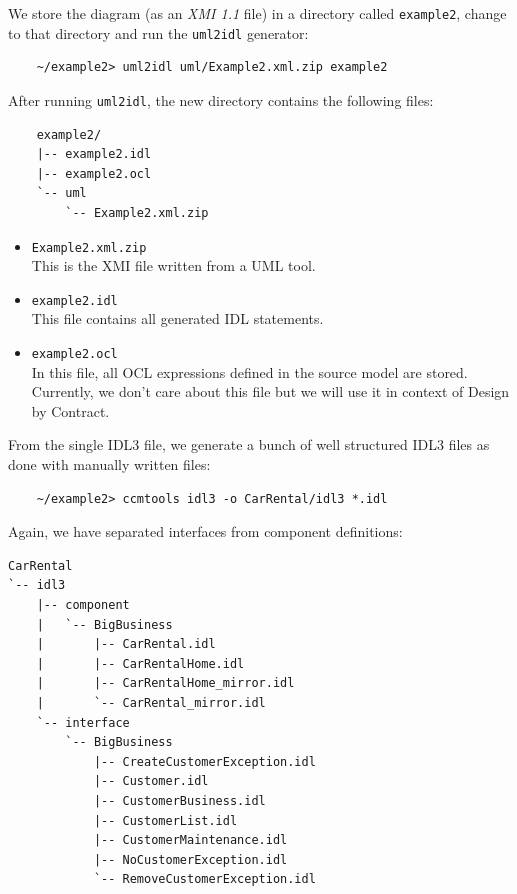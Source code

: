 We store the diagram (as an {\it XMI 1.1} file) in a directory called 
{\tt example2}, change to that directory and run the {\tt uml2idl} generator:
\begin{small}
\begin{verbatim}
    ~/example2> uml2idl uml/Example2.xml.zip example2
\end{verbatim}
\end{small}
After running {\tt uml2idl}, the new directory contains the following files:
\begin{small}
\begin{verbatim}
    example2/
    |-- example2.idl
    |-- example2.ocl
    `-- uml
        `-- Example2.xml.zip
\end{verbatim}
\end{small}

\newpage
\begin{itemize}
\item {\tt Example2.xml.zip}\\
This is the XMI file written from a UML tool.

\item {\tt example2.idl}\\ 
This file contains all generated IDL statements. 

\item {\tt example2.ocl} \\
In this file, all OCL expressions defined in the source model are stored.
Currently, we don't care about this file but we will use it in context of
Design by Contract. 
\end{itemize}

From the single IDL3 file, we generate a bunch of well structured 
IDL3 files as done with manually written files:
\begin{small}
\begin{verbatim}
    ~/example2> ccmtools idl3 -o CarRental/idl3 *.idl
\end{verbatim}
\end{small}

Again, we have separated interfaces from component definitions:
\begin{small}
\begin{verbatim}
CarRental
`-- idl3
    |-- component
    |   `-- BigBusiness
    |       |-- CarRental.idl
    |       |-- CarRentalHome.idl
    |       |-- CarRentalHome_mirror.idl
    |       `-- CarRental_mirror.idl
    `-- interface
        `-- BigBusiness
            |-- CreateCustomerException.idl
            |-- Customer.idl
            |-- CustomerBusiness.idl
            |-- CustomerList.idl
            |-- CustomerMaintenance.idl
            |-- NoCustomerException.idl
            `-- RemoveCustomerException.idl
\end{verbatim}
\end{small}

